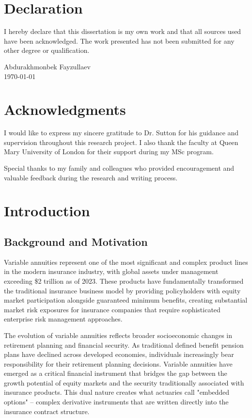 \documentclass[12pt,a4paper]{report}
\begin{document}
\chapter*{Declaration}
I hereby declare that this dissertation is my own work and that all sources used have been acknowledged. The work presented has not been submitted for any other degree or qualification.

\vspace{2cm}
\noindent Abdurakhmonbek Fayzullaev\\
\today

\chapter*{Acknowledgments}
I would like to express my sincere gratitude to Dr. Sutton for his guidance and supervision throughout this research project. I also thank the faculty at Queen Mary University of London for their support during my MSc program.

Special thanks to my family and colleagues who provided encouragement and valuable feedback during the research and writing process.

\tableofcontents
\listoffigures
\listoftables

\chapter{Introduction}

\section{Background and Motivation}

Variable annuities represent one of the most significant and complex product lines in the modern insurance industry, with global assets under management exceeding \$2 trillion as of 2023. These products have fundamentally transformed the traditional insurance business model by providing policyholders with equity market participation alongside guaranteed minimum benefits, creating substantial market risk exposures for insurance companies that require sophisticated enterprise risk management approaches.

The evolution of variable annuities reflects broader socioeconomic changes in retirement planning and financial security. As traditional defined benefit pension plans have declined across developed economies, individuals increasingly bear responsibility for their retirement planning decisions. Variable annuities have emerged as a critical financial instrument that bridges the gap between the growth potential of equity markets and the security traditionally associated with insurance products. This dual nature creates what actuaries call "embedded options" – complex derivative instruments that are written directly into the insurance contract structure.
\end{document}
